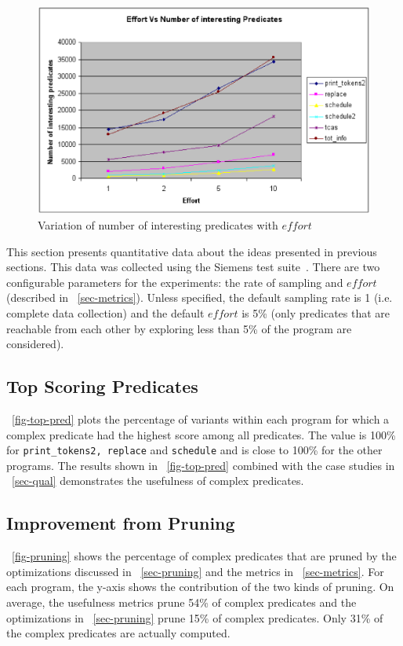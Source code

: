 \begin{figure}
  \centering
  \includegraphics[width=\columnwidth]{charts/effort}
  \caption{Variation of number of interesting predicates with $effort$}
  \label{fig-effort}
\end{figure}

This section presents quantitative data about the ideas presented in previous sections.  This data was collected using the Siemens test suite~\cite{257766}.  There are two configurable parameters for the experiments: the rate of sampling and $effort$ (described in ~\autoref{sec-metrics}).  Unless specified, the default sampling rate is 1 (i.e. complete data collection) and the default $effort$ is 5\% (only predicates that are reachable from each other by exploring less than 5\% of the program are considered).

\subsection{Top Scoring Predicates}
~\autoref{fig-top-pred} plots the percentage of variants within each program for which a complex predicate had the highest score among all predicates.  The value is 100\% for \texttt{print\_tokens2, replace} and \texttt{schedule} and is close to 100\% for the other programs.  The results shown in ~\autoref{fig-top-pred} combined with the case studies in ~\autoref{sec-qual} demonstrates the usefulness of complex predicates.

\subsection{Improvement from Pruning}
~\autoref{fig-pruning} shows the percentage of complex predicates that are pruned by the optimizations discussed in ~\autoref{sec-pruning} and the metrics in ~\autoref{sec-metrics}.  For each program, the y-axis shows the contribution of the two kinds of pruning.  On average, the usefulness metrics prune 54\% of complex predicates and the optimizations in ~\autoref{sec-pruning} prune 15\% of complex predicates.  Only 31\% of the complex predicates are actually computed.

